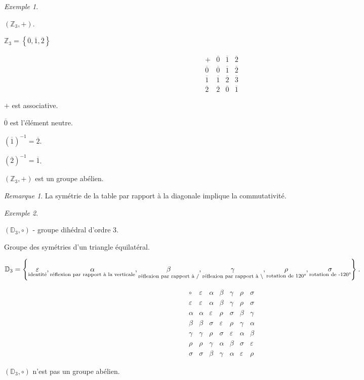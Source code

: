 \documentclass{report}
\theoremstyle{definition}
\theoremstyle{remark}
\newtheorem*{exem}{Exemple}
\newtheorem*{rema}{Remarque}
\begin{document}
	\begin{exem}
		~

		$\left( \mathbb{Z}_3,+ \right)$.

		$\mathbb{Z}_3=\left\lbrace \overline{0}, \overline{1}, \overline{2} \right\rbrace$

		\renewcommand{\arraystretch}{1.5}
		\[
		\begin{array}{c||c|c|c}
			+&\overline0&\overline1&\overline2\\
			\hline\hline
			\overline0&\overline0&\overline1&\overline2\\
			\hline
			\overline1&\overline1&\overline2&\overline3\\
			\hline
			\overline2&\overline2&\overline0&\overline1
		\end{array}
		\]
		\renewcommand{\arraystretch}{1}

		$+$ est associative.

		$\overline{0}$ est l'\'el\'ement neutre.

		$(\overline{1})^{-1}=\overline{2}$.

		$(\overline{2})^{-1}=\overline{1}$.

		$\left( \mathbb{Z}_3,+ \right)$ est un groupe ab\'elien.
		\begin{rema}
			La sym\'etrie de la table par rapport \`a la diagonale implique la commutativit\'e.
		\end{rema}
	\end{exem}
	\begin{exem}
		~

		$\left( \mathbb{D}_3, \circ \right)$ - groupe dih\'edral d'ordre 3.

		Groupe des sym\'etries d'un triangle \'equilat\'eral.

		$\mathbb{D}_3=\left\lbrace \underset{\text{identit\'e}}{\varepsilon}, \underset{\text{r\'eflexion par rapport \`a la verticale}}{\alpha}, \underset{\text{r\'eflexion par rapport \`a /}}{\beta}, \underset{\text{r\'eflexion par rapport \`a \textbackslash}}{\gamma}, \underset{\text{rotation de 120\textdegree}}{\rho}, \underset{\text{rotation de -120\textdegree}}{\sigma} \right\rbrace$.

		\[
		\begin{array}{c||c|c|c|c|c|c}
			\circ&\varepsilon&\alpha&\beta&\gamma&\rho&\sigma\\
			\hline\hline
			\varepsilon&\varepsilon&\alpha&\beta&\gamma&\rho&\sigma\\
			\hline
			\alpha&\alpha&\varepsilon&\rho&\sigma&\beta&\gamma\\
			\hline
			\beta&\beta&\sigma&\varepsilon&\rho&\gamma&\alpha\\
			\hline
			\gamma&\gamma&\rho&\sigma&\varepsilon&\alpha&\beta\\
			\hline
			\rho&\rho&\gamma&\alpha&\beta&\sigma&\varepsilon\\
			\hline
			\sigma&\sigma&\beta&\gamma&\alpha&\varepsilon&\rho
		\end{array}
		\]

		$\left( \mathbb{D}_3, \circ \right)$ n'est pas un groupe ab\'elien.
	\end{exem}
\end{document}

